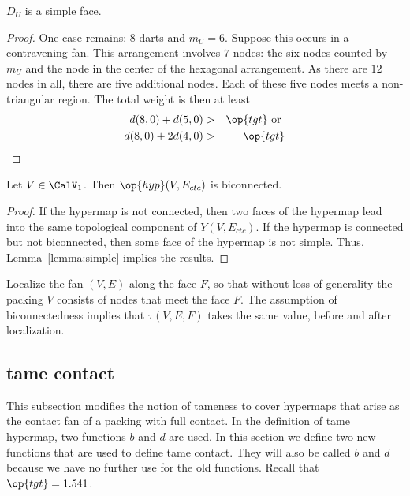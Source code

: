 \begin{lemma}[]\label{lemma:simple} $D_U$ is a
simple face.
\end{lemma}
%
%

\begin{proof} One case remains: $8$ darts and $m_U=6$.  Suppose this
  occurs in a contravening fan.  This arrangement involves $7$ nodes:
  the six nodes counted by $m_U$ and the node in the center of the
  hexagonal arrangement.  As there are $12$ nodes in all, there are
  five additional nodes.  Each of these five nodes meets a
  non-triangular region.  The total weight is then at least
\begin{eqnarray*}
d(8,0) + d(5,0) &>& \op{tgt}\hbox{ or }\\
d(8,0) + 2 d(4,0) &>& \op{tgt}\\
\end{eqnarray*}
\end{proof}
%
%

\begin{lemma}[biconnected]\label{lemma:biconnected}
Let $V\in \CalV_1$.  Then $\op{hyp}(V,E_{ctc})$ is biconnected.
\end{lemma}

\begin{proof}
  If the hypermap is not connected, then two faces of the hypermap
  lead into the same topological component of $Y(V,E_{ctc})$.  If the
  hypermap is connected but not biconnected, then some face of the
  hypermap is not simple.  Thus, Lemma~\ref{lemma:simple} implies the
  results.
\end{proof}




\begin{remark}\label{rem:local-same} %
  Localize the fan $(V,E)$ along the face $F$, so that without loss of generality
   the packing $V$ consists of
  nodes that meet the face $F$.  
The assumption of biconnectedness
 implies that $\tau(V,E,F)$ takes the same value, before and after localization.
\end{remark}






\subsection{tame contact}

This subsection modifies the notion of tameness to cover hypermaps that arise as
the contact fan of a packing with full contact.  In the definition of tame hypermap, two functions
$b$ and $d$ are used.  In this section we define two new functions that are used to define
tame contact.  They will also be called $b$ and $d$ because
we have no further use for the old functions.  Recall that $\op{tgt}=1.541$.
%
%

